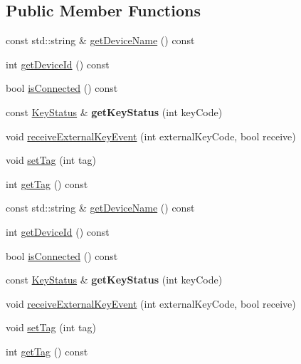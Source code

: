 \subsection*{Public Member Functions}
\begin{DoxyCompactItemize}
\item 
const std\+::string \& \hyperlink{classController_a58c7b72640130609ca3c039b256ce2b1}{get\+Device\+Name} () const
\item 
int \hyperlink{classController_adcfe0c2c19b7d32167f6937e9d8c2afd}{get\+Device\+Id} () const
\item 
bool \hyperlink{classController_ac2d6cd3552f3ffc8fa6454f0a4ab7692}{is\+Connected} () const
\item 
\mbox{\label{classController_a64416e35127603cc9b6cc94179f89f3f}} 
const \hyperlink{structController_1_1__keyStatus}{Key\+Status} \& {\bfseries get\+Key\+Status} (int key\+Code)
\item 
void \hyperlink{classController_a196df7e52d96b0094f7b27adc5cd4077}{receive\+External\+Key\+Event} (int external\+Key\+Code, bool receive)
\item 
void \hyperlink{classController_a0995ba881e0a6ee1b71a2fd366dcad90}{set\+Tag} (int tag)
\item 
int \hyperlink{classController_ae82854fd0c1abb1ebe9cd311b648a3d2}{get\+Tag} () const
\item 
const std\+::string \& \hyperlink{classController_a58c7b72640130609ca3c039b256ce2b1}{get\+Device\+Name} () const
\item 
int \hyperlink{classController_adcfe0c2c19b7d32167f6937e9d8c2afd}{get\+Device\+Id} () const
\item 
bool \hyperlink{classController_ac2d6cd3552f3ffc8fa6454f0a4ab7692}{is\+Connected} () const
\item 
\mbox{\label{classController_ab02cab288af9ccc1e18ab60cbfe43fbe}} 
const \hyperlink{structController_1_1__keyStatus}{Key\+Status} \& {\bfseries get\+Key\+Status} (int key\+Code)
\item 
void \hyperlink{classController_a196df7e52d96b0094f7b27adc5cd4077}{receive\+External\+Key\+Event} (int external\+Key\+Code, bool receive)
\item 
void \hyperlink{classController_a0995ba881e0a6ee1b71a2fd366dcad90}{set\+Tag} (int tag)
\item 
int \hyperlink{classController_ae82854fd0c1abb1ebe9cd311b648a3d2}{get\+Tag} () const
\end{DoxyCompactItemize}

